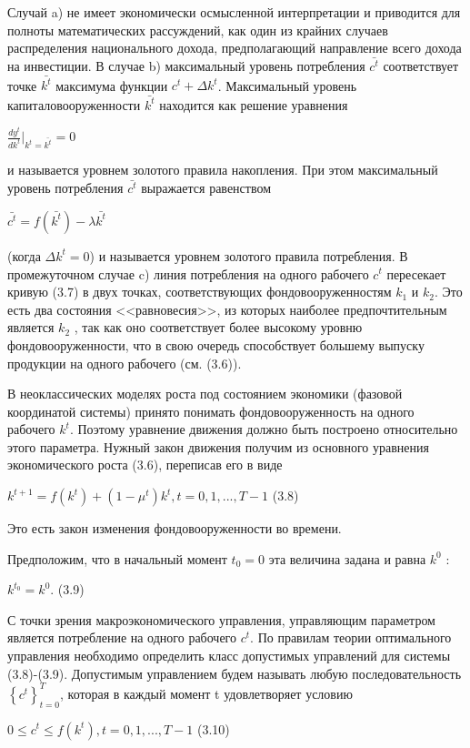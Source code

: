 \documentclass[12pt, 4paper]{book}
\begin{document}
{Случай a) не имеет экономически осмысленной интерпретации и приводится для полноты математических рассуждений, как один из крайних случаев распределения национального дохода, предполагающий направление всего дохода на инвестиции. В случае b) максимальный уровень потребления $\bar{c^t}$ соответствует точке $\bar{k^t}$ максимума функции $c^t+\Delta k^t$. Максимальный уровень капиталовооруженности  $\bar{k^t}$ находится как решение уравнения
\begin{center}
$\frac{d y^t}{d k^t}|_{k^t=\bar{k^t}}=0$
\end{center}
и называется уровнем золотого правила накопления. При этом максимальный уровень потребления $\bar{c^t}$ выражается равенством
\begin{center}
$\bar{c^t}=f(\bar{k^t})- \lambda \bar{k^{t}}$
\end{center}
(когда $\Delta k^t = 0$) и называется уровнем золотого правила потребления. В промежуточном случае c) линия потребления на одного рабочего $c^t$ пересекает кривую (3.7) в двух точках, соответствующих фондовооруженностям $k_1$ и $k_2$. Это есть два состояния <<равновесия>>, из которых наиболее предпочтительным является $k_2$ , так как оно соответствует более высокому уровню фондовооруженности, что в свою очередь способствует большему выпуску продукции на одного рабочего (см. (3.6)).
\par

В неоклассических моделях роста под состоянием экономики (фазовой координатой системы) принято понимать фондовооруженность на одного рабочего $k^t$. Поэтому уравнение движения должно быть построено относительно этого параметра. Нужный закон движения получим из основного уравнения экономического роста (3.6), переписав его в виде
\begin{center}
$k^{t+1} = f(k^{t})+(1- \mu^t)k^t, t=0,1,...,T-1$ (3.8)
\end{center}
Это есть закон изменения фондовооруженности во времени.
\par

Предположим, что в начальный момент $t_0=0$ эта величина задана и равна $k^0$ :
\begin{center}
$k^{t_0} = k^0$. (3.9)
\end{center}
С точки зрения макроэкономического управления, управляющим параметром является потребление на одного рабочего $c^t$. По правилам теории оптимального управления необходимо определить класс допустимых управлений для системы (3.8)-(3.9). Допустимым управлением будем называть любую последовательность $\left\{c^t\right\}_{t=0}^T$, которая в каждый момент t удовлетворяет условию
\begin{center}
$0 \leq c^t \leq f(k^t), t=0,1,...,T-1$ (3.10)
\end{center}
\par

}
\end{document}
